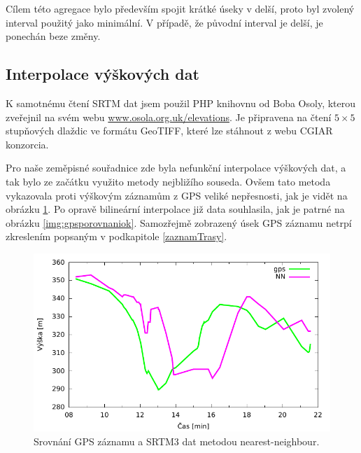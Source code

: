 \documentclass[thesis=B,czech]{FITthesis}[2012/06/26]
\begin{document}
Cílem této agregace bylo především spojit krátké úseky v delší, proto byl zvolený interval použitý jako minimální. V případě, že původní interval je delší, je ponechán beze změny. 

\subsection{Interpolace výškových dat}
K samotnému čtení SRTM dat jsem použil PHP knihovnu od Boba Osoly, kterou zveřejnil na svém webu \href{http://www.osola.org.uk/elevations}{www.osola.org.uk/elevations}. Je připravena na čtení $5 \times 5$ stupňových dlaždic ve formátu GeoTIFF, které lze stáhnout z webu CGIAR konzorcia. 

Pro naše zeměpisné souřadnice zde byla nefunkční interpolace výškových dat, a tak bylo ze začátku využito metody nejbližího souseda. Ovšem tato metoda vykazovala proti výškovým záznamům z GPS veliké nepřesnosti, jak je vidět na obrázku \ref{img:gpsporovnani}. Po opravě bilineární interpolace již data souhlasila, jak je patrné na obrázku \ref{img:gpsporovnaniok}. Samozřejmě zobrazený úsek GPS záznamu netrpí zkreslením popsaným v podkapitole \ref{zaznamTrasy}.


 \begin{figure}[p]\centering
 	\includegraphics[page=1]{grafy/porovnani.pdf}
 	\caption{Srovnání GPS záznamu a SRTM3 dat metodou nearest-neighbour.}
 	\label{img:gpsporovnani}
 \end{figure}
\end{document}
